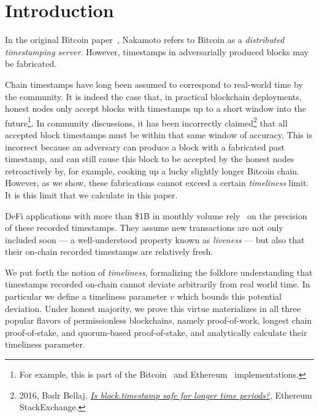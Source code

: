 \section{Introduction}
In the original Bitcoin paper~\cite{bitcoin}, Nakamoto refers to
Bitcoin as a \emph{distributed timestamping server}.
However, timestamps in adversarially produced blocks may be fabricated.

Chain timestamps have long been assumed to correspond to real-world time by the community.
It is indeed the case that, in practical blockchain deployments, honest nodes only accept
blocks with timestamps up to a short window into the future\footnote{
  For example, this is part of the Bitcoin~\cite{bitcoin-code-future-blocks}
  and Ethereum~\cite{geth-future-blocks} implementations.
}.
In community discussions, it has been incorrectly
claimed\footnote{2016, Badr Bellaj, \href{https://ethereum.stackexchange.com/questions/6795/is-block-timestamp-safe-for-longer-time-periods}{\emph{Is block.timestamp safe for longer time periods?}}, Ethereum StackExchange.}
that all accepted block timestamps must be within that same window of accuracy.
This is incorrect because an adversary can produce a block with a fabricated past timestamp,
and can still cause this block to be accepted by the honest nodes retroactively by, for example, cooking
up a lucky slightly longer Bitcoin chain. However, as we show, these fabrications
cannot exceed a certain \emph{timeliness} limit. It is this limit that we calculate in this paper.

DeFi applications with more than \$1B in monthly volume
rely~\cite{0x-timestamp} on the precision of these recorded timestamps.
They assume new transactions are not only
included soon --- a well-understood property known as \emph{liveness} ---
but also that their on-chain recorded timestamps are relatively fresh.

We put forth the notion of \emph{timeliness}, formalizing the folklore
understanding that timestamps recorded on-chain cannot deviate arbitrarily
from real world time. In particular we define a timeliness parameter $v$ which bounds
this potential deviation. Under honest majority, we prove this virtue materializes in all three popular flavors of
permissionless blockchains, namely proof-of-work,
longest chain proof-of-stake, and quorum-based proof-of-stake, and analytically
calculate their timeliness parameter.

